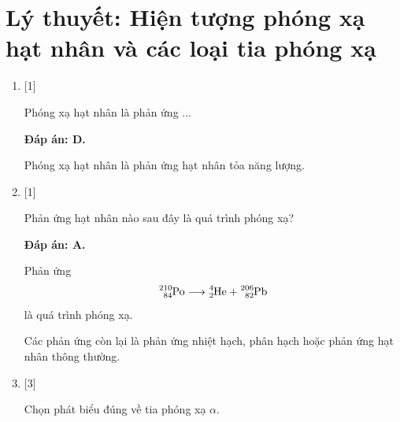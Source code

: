 \whiteBGstarBegin
\setcounter{section}{0}
\section{Lý thuyết: Hiện tượng phóng xạ hạt nhân và các loại tia phóng xạ}
\begin{enumerate}[label=\bfseries Câu \arabic*:]
	\item {} [1]
	
	\cauhoi
	{Phóng xạ hạt nhân là phản ứng ...
	}
	
	\loigiai
	{		\textbf{Đáp án: D.}
		
		Phóng xạ hạt nhân là phản ứng hạt nhân tỏa năng lượng.
		
	}
	
	\item {} [1]
	
	\cauhoi
	{Phản ứng hạt nhân nào sau đây là quá trình phóng xạ?
	}
	
	\loigiai
	{		\textbf{Đáp án: A.}
		
		Phản ứng
		$$\ce{^210_84 Po} \longrightarrow \ce{^4_2 He} + \ce{^206_82 Pb}$$
		là quá trình phóng xạ.
		
		Các phản ứng còn lại là phản ứng nhiệt hạch, phân hạch hoặc phản ứng hạt nhân thông thường.
		
	}
		\item {} [3]
	
	\cauhoi
	{Chọn phát biểu đúng về tia phóng xạ $\alpha$.
	}
	

\end{enumerate}
